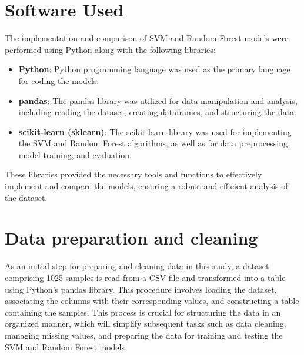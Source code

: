 \section{Software Used}
The implementation and comparison of SVM and Random Forest models were performed using Python along with the following libraries:
\begin{itemize}
    \item \textbf{Python}: Python programming language was used as the primary language for coding the models.
    \item \textbf{pandas}: The pandas library was utilized for data manipulation and analysis, including reading the dataset, creating dataframes, and structuring the data.
    \item \textbf{scikit-learn (sklearn)}: The scikit-learn library was used for implementing the SVM and Random Forest algorithms, as well as for data preprocessing, model training, and evaluation.
\end{itemize}
These libraries provided the necessary tools and functions to effectively implement and compare the models, ensuring a robust and efficient analysis of the dataset.

\section{Data preparation and cleaning}
As an initial step for preparing and cleaning data in this study, a dataset comprising 1025 samples is read from a CSV file and transformed into a table using Python's pandas library. This procedure involves loading the dataset, associating the columns with their corresponding values, and constructing a table containing the samples. This process is crucial for structuring the data in an organized manner, which will simplify subsequent tasks such as data cleaning, managing missing values, and preparing the data for training and testing the SVM and Random Forest models.

